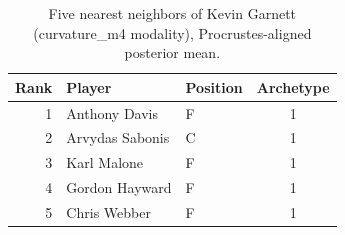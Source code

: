 \begin{table}[htbp]
  \centering\small
  \begin{tabular}{rllc}
    \toprule
    Rank & Player & Position & Archetype \\
    \midrule
    1 & Anthony Davis & F & 1 \\
    2 & Arvydas Sabonis & C & 1 \\
    3 & Karl Malone & F & 1 \\
    4 & Gordon Hayward & F & 1 \\
    5 & Chris Webber & F & 1 \\
    \bottomrule
  \end{tabular}
  \caption{Five nearest neighbors of Kevin Garnett (curvature_m4 modality), Procrustes-aligned posterior mean.}
  \label{tab:Kevin_Garnett_neighbors_curvature_m4}
\end{table}

